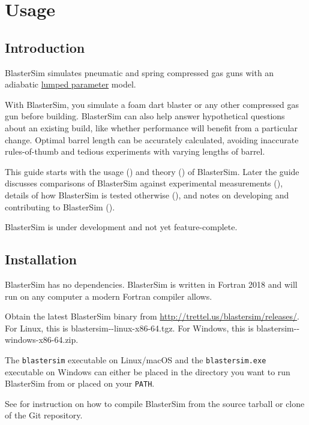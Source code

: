 \chapter{Usage}\label{usage}

\section{Introduction}\label{intro}

BlasterSim simulates pneumatic and spring compressed gas guns with an adiabatic \href{https://en.wikipedia.org/wiki/Lumped-element_model}{lumped parameter} model.

With BlasterSim, you simulate a foam dart blaster or any other compressed gas gun before building. %
BlasterSim can also help answer hypothetical questions about an existing build, like whether performance will benefit from a particular change.
Optimal barrel length can be accurately calculated, avoiding inaccurate rules-of-thumb and tedious experiments with varying lengths of barrel.

This guide starts with the usage () and theory () of BlasterSim.
Later the guide discusses comparisons of BlasterSim against experimental measurements (), details of how BlasterSim is tested otherwise (), and notes on developing and contributing to BlasterSim ().

BlasterSim is under development and not yet feature-complete.

\section{Installation}\label{installation}

BlasterSim has no dependencies.
BlasterSim is written in Fortran 2018 and will run on any computer a modern Fortran compiler allows.

Obtain the latest BlasterSim binary from \url{http://trettel.us/blastersim/releases/}.
For Linux, this is blastersim-\gittag-linux-x86-64.tgz. %
For Windows, this is blastersim-\gittag-windows-x86-64.zip. %

The \texttt{blastersim} executable on Linux/macOS and the \texttt{blastersim.exe} executable on Windows can either be placed in the directory you want to run BlasterSim from or placed on your \texttt{PATH}.

See  for instruction on how to compile BlasterSim from the source tarball or clone of the Git repository.

